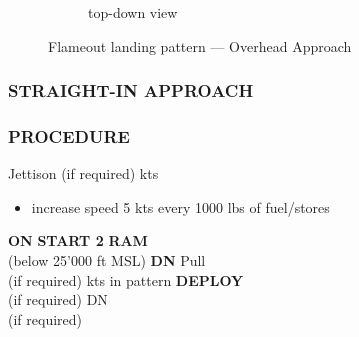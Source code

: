 \begin{figure}[htbp]
\begin{subfigure}[t]{\linewidth}
        \caption{top-down view}
    \end{subfigure}
    \caption{Flameout landing pattern --- Overhead Approach}
    \label{fig:proc_basic:landing:overhead2}
\end{figure}

\subsubsection{STRAIGHT-IN APPROACH}

\marginfigeometry

\subsubsection{PROCEDURE}

\begin{checklistenumerate}
    \blueitem[Stores]\dotfill Jettison (if required)
    \blueitem[Airspeed] kts
    \begin{itemize}
        \item increase speed 5 kts every 1000 lbs of fuel/stores
    \end{itemize}
    \blueitem[EPU]\dotfill \textbf{ON}
    \dotfill \textbf{START 2}
    \dotfill \textbf{RAM}\\
    \hfill(below 25'000 ft MSL)
    \blueitem[LG Handle]\dotfill \textbf{DN}
    \dotfill Pull\\
    \hfill(if required)
    \blueitem[Airspeed] kts in pattern
    \dotfill \textbf{DEPLOY}\\
    \hfill(if required)
    \dotfill DN\\
    \hfill(if required)
\end{checklistenumerate}

\clearpage

\marginfigrestore